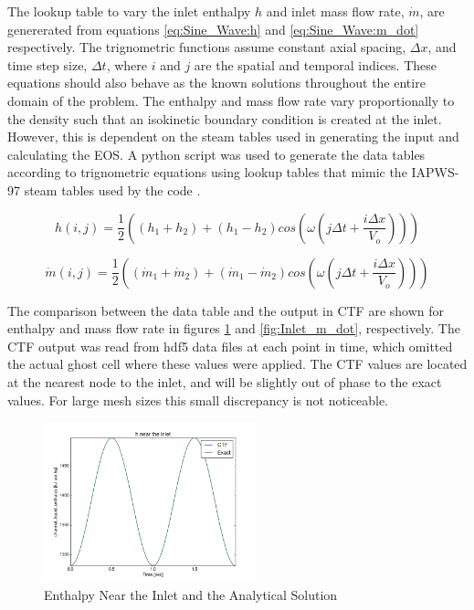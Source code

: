 \documentclass{mc2015}
\begin{document}
The lookup table to vary the inlet enthalpy $h$ and inlet mass
flow rate, $\dot{m}$, are genererated from equations \ref{eq:Sine_Wave:h} and
\ref{eq:Sine_Wave:m_dot} respectively. The trignometric functions assume
constant axial spacing, $\Delta x$, and time step size, $\Delta t$, where $i$
and $j$ are the spatial and temporal indices. These equations should also
behave as the known solutions throughout the entire domain of the problem. The
enthalpy and mass flow rate vary proportionally to the density such that an
isokinetic boundary condition is created at the inlet. However, this is
dependent on the steam tables used in generating the input and calculating the
EOS. A python script was used to generate the data tables according to
trignometric equations using lookup tables that mimic the IAPWS-97 steam tables
used by the code \cite{Cooper2007}.

\begin{equation}
	\label{eq:Sine_Wave:h}
	h(i,j) = \frac{1}{2} \left( 
			(h_{1}+h_{2}) + (h_{1}-h_{2}) cos\left(
				\omega \left( j \Delta t + \frac{i \Delta x}{V_{o}} \right)
				\right)
			\right)
\end{equation}

\begin{equation}
	\label{eq:Sine_Wave:m_dot}
	\dot{m}(i,j) = \frac{1}{2} \left( 
			(\dot{m}_{1}+\dot{m}_{2}) + (\dot{m}_{1}-\dot{m}_{2}) cos\left(
				\omega \left( j \Delta t + \frac{i \Delta x}{V_{o}} \right)
				\right)
			\right)
\end{equation}


The comparison between the data table and the output in CTF are shown for
enthalpy and mass flow rate in figures \ref{fig:Inlet_h} and
\ref{fig:Inlet_m_dot}, respectively. The CTF output was read from hdf5 data
files at each point in time, which omitted the actual ghost cell where these values
were applied. The CTF values are located at the nearest node to the inlet, and
will be slightly out of phase to the exact values. For large mesh sizes this
small discrepancy is not noticeable.

\begin{figure}[!h]
	\centering
	\includegraphics[width=0.55\textwidth]{images/Code_Verification/run_00_00/residual/results/Inlet_h}
	\caption{Enthalpy Near the Inlet and the Analytical Solution}
	\label{fig:Inlet_h}
\end{figure}
\end{document}
